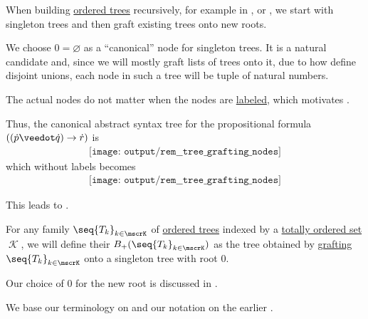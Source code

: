 \begin{remark}\label{rem:tree_grafting_nodes}
  When building \hyperref[def:ordered_tree]{ordered trees} recursively, for example in ,  or , we start with singleton trees and then graft existing trees onto new roots.

  We choose \( 0 = \varnothing \) as a \enquote{canonical} node for singleton trees. It is a natural candidate and, since we will mostly graft lists of trees onto it, due to how define disjoint unions, each node in such a tree will be tuple of natural numbers.

  The actual nodes do not matter when the nodes are \hyperref[def:labeled_set]{labeled}, which motivates .

  Thus, the canonical abstract syntax tree for the propositional formula \( ((\synp \synvee \synq) \rightarrow \syn r) \) is
  \begin{equation*}
    \begin{aligned}
      \texttt{[image: output/rem\_\_tree\_grafting\_nodes]}
    \end{aligned}
  \end{equation*}
  which without labels becomes
  \begin{equation*}
    \begin{aligned}
      \texttt{[image: output/rem\_\_tree\_grafting\_nodes]}
    \end{aligned}
  \end{equation*}

  This leads to .
\end{remark}

\begin{definition}\label{def:ordered_tree_grafting_product}\mimprovised
  For any family \( \seq{ T_k }_{k \in \mscrK} \) of \hyperref[def:ordered_tree]{ordered trees} indexed by a \hyperref[def:totally_ordered_set]{totally ordered set} \( \mscrK \), we will define their  \( B_+(\seq{ T_k }_{k \in \mscrK}) \) as the tree obtained by \hyperref[def:labeled_tree_grafting]{grafting} \( \seq{ T_k }_{k \in \mscrK} \) onto a singleton tree with root \( 0 \).
\end{definition}
\begin{comments}
  \item Our choice of \( 0 \) for the new root is discussed in .

  \item We base our terminology on \cite[]{Holtkamp2011} and our notation on the earlier \cite[9]{Hoffman2002}.
\end{comments}

